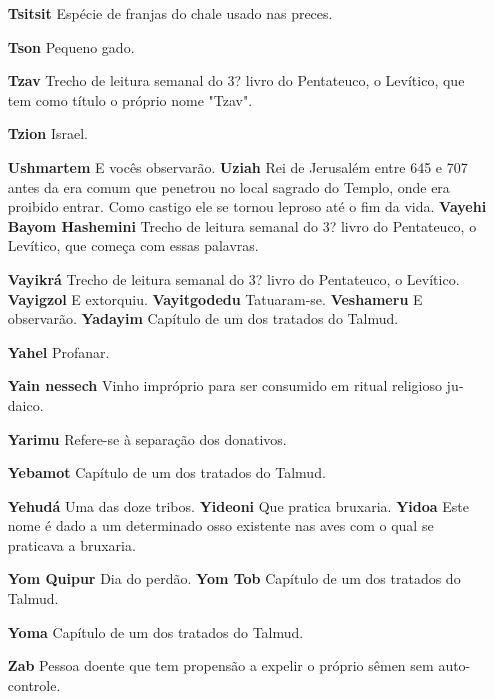 \begin{itemize}
\begin{enumrate}
\begin{itemize}
\begin{itemize}
\begin{itemize}
\begin{itemize}
\begin{itemize}
\item[\textbf{Tsitsit}] Espécie de franjas do chale usado nas preces.

\item[\textbf{Tson}] Pequeno gado.

\item[\textbf{Tzav}] Trecho de leitura semanal do 3? livro do Pentateuco, o
Levítico, que tem como título o próprio nome "Tzav".

\item[\textbf{Tzion}] Israel.

\item[\textbf{Ushmartem} E vocês observarão. \textbf{Uziah}] Rei de
Jerusalém entre 645 e 707 antes da era comum que penetrou no local
sagrado do Templo, onde era proibido entrar. Como castigo ele se tornou
leproso até o fim da vida. \textbf{Vayehi Bayom Hashemini} Trecho de
leitura semanal do 3? livro do Pen­tateuco, o Levítico, que começa com
essas palavras.

\item[\textbf{Vayikrá}] Trecho de leitura semanal do 3? livro do Pentateuco,
o Levítico. \textbf{Vayigzol} E extorquiu. \textbf{Vayitgodedu}
Tatuaram-se. \textbf{Veshameru} E observarão. \textbf{Yadayim}
Capítulo de um dos trata­dos do Talmud.

\item[\textbf{Yahel}] Profanar.

\item[\textbf{Yain nessech}] Vinho impróprio pa­ra ser consumido em ritual
religioso ju­daico.

\item[\textbf{Yarimu}] Refere-se à separação dos donativos.

\item[\textbf{Yebamot}] Capítulo de um dos trata­dos do Talmud.

\item[\textbf{Yehudá} Uma das doze tribos. \textbf{Yideoni}] Que pratica
bruxaria. \textbf{Yidoa} Este nome é dado a um deter­minado osso
existente nas aves com o qual se praticava a bruxaria.

\item[\textbf{Yom Quipur} Dia do perdão. \textbf{Yom Tob}] Capítulo de um
dos trata­dos do Talmud.

\item[\textbf{Yoma}] Capítulo de um dos tratados do Talmud.

\item[\textbf{Zab}] Pessoa doente que tem propen­são a expelir o próprio
sêmen sem au­to-controle.


\end{itemize}
\end{itemize}
\end{itemize}
\end{itemize}
\end{itemize}
\end{enumrate}
\end{itemize}
